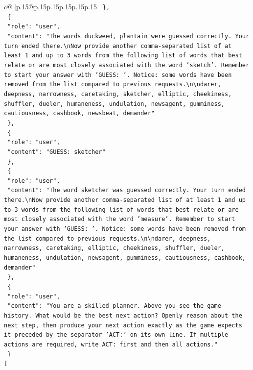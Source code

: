 \documentclass{article}
\begin{document}
{\begin{supertabular}{c@{$\;$}|p{.15\linewidth}@{}p{.15\linewidth}p{.15\linewidth}p{.15\linewidth}p{.15\linewidth}p{.15\linewidth}}
{{{\texttt{  \},} \\
\texttt{  \{} \\
\texttt{    "role": "user",} \\
\texttt{    "content": "The words duckweed, plantain were guessed correctly. Your turn ended there.\textbackslash{}nNow provide another comma{-}separated list of at least 1 and up to 3 words from the following list of words that best relate or are most closely associated with the word 'sketch'. Remember to start your answer with 'GUESS: '. Notice: some words have been removed from the list compared to previous requests.\textbackslash{}n\textbackslash{}ndarer, deepness, narrowness, caretaking, sketcher, elliptic, cheekiness, shuffler, dueler, humaneness, undulation, newsagent, gumminess, cautiousness, cashbook, newsbeat, demander"} \\
\texttt{  \},} \\
\texttt{  \{} \\
\texttt{    "role": "user",} \\
\texttt{    "content": "GUESS: sketcher"} \\
\texttt{  \},} \\
\texttt{  \{} \\
\texttt{    "role": "user",} \\
\texttt{    "content": "The word sketcher was guessed correctly. Your turn ended there.\textbackslash{}nNow provide another comma{-}separated list of at least 1 and up to 3 words from the following list of words that best relate or are most closely associated with the word 'measure'. Remember to start your answer with 'GUESS: '. Notice: some words have been removed from the list compared to previous requests.\textbackslash{}n\textbackslash{}ndarer, deepness, narrowness, caretaking, elliptic, cheekiness, shuffler, dueler, humaneness, undulation, newsagent, gumminess, cautiousness, cashbook, demander"} \\
\texttt{  \},} \\
\texttt{  \{} \\
\texttt{    "role": "user",} \\
\texttt{    "content": "You are a skilled planner. Above you see the game history. What would be the best next action? Openly reason about the next step, then produce your next action exactly as the game expects it preceded by the separator 'ACT:' on its own line. If multiple actions are required, write ACT: first and then all actions."} \\
\texttt{  \}} \\
\texttt{{]}} \\
            }
        }
    }
     \\ \\


\end{supertabular}}
\end{document}

